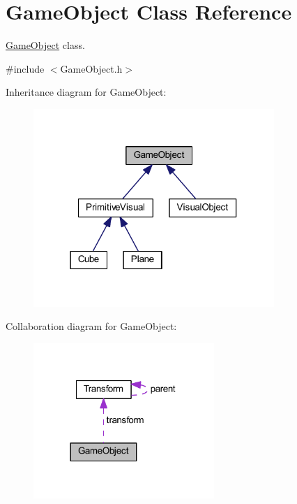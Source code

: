 \hypertarget{class_game_object}{}\section{Game\+Object Class Reference}
\label{class_game_object}


\mbox{\hyperlink{class_game_object}{Game\+Object}} class.  




{\ttfamily \#include $<$Game\+Object.\+h$>$}



Inheritance diagram for Game\+Object\+:
\nopagebreak
\begin{figure}[H]
\begin{center}
\leavevmode
\includegraphics[width=259pt]{class_game_object__inherit__graph}
\end{center}
\end{figure}


Collaboration diagram for Game\+Object\+:\nopagebreak
\begin{figure}[H]
\begin{center}
\leavevmode
\includegraphics[width=194pt]{class_game_object__coll__graph}
\end{center}
\end{figure}

